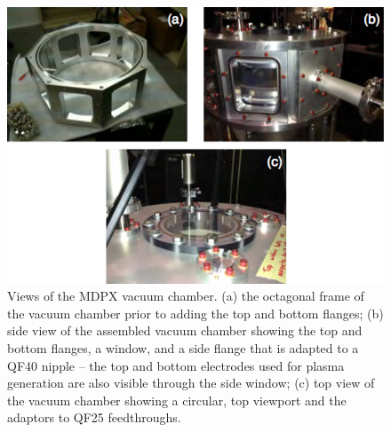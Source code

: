 
\begin{figure}[h]
\begin{center}
\includegraphics[width=5in]{figures/chamber.png}
\caption{Views of the MDPX vacuum chamber. (a) the octagonal frame of the vacuum chamber prior to adding the top and bottom flanges; (b) side view of the assembled vacuum chamber showing the top and bottom flanges, a window, and a side flange that is adapted to a QF40 nipple -- the top and bottom electrodes used for plasma generation are also visible through the side window; (c) top view of the vacuum chamber showing a circular, top viewport and the adaptors to QF25 feedthroughs\cite{PLA:9579370}.\label{chamber}}
\end{center}
\end{figure}

